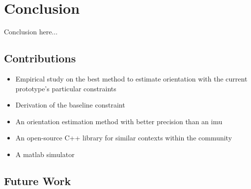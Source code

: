 
\chapter{Conclusion}
\label{conclusion}
Conclusion here...

\section{Contributions}
\begin{itemize}
\item Empirical study on the best method to estimate orientation with the current prototype's particular constraints

\item Derivation of the baseline constraint

\item An orientation estimation method with better precision than an \acrshort{imu}

\item An open-source C++ library for similar contexts within the community

\item A matlab simulator 

\end{itemize}

\section{Future Work}
